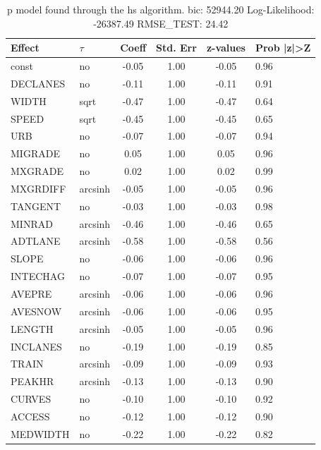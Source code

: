 \begin{table}
	\caption{p model found through the hs algorithm. bic: 52944.20 Log-Likelihood: -26387.49 RMSE_TEST: 24.42}
	\begin{center}
		\begin{tabular}{|l|l|c|c|c|l|}
			\hline
			Effect & $\tau$ & Coeff & Std. Err & z-values & Prob |z|>Z \\
			\hline
			const & no & -0.05 & 1.00 & -0.05 & 0.96 \\
			\hline
			DECLANES & no & -0.11 & 1.00 & -0.11 & 0.91 \\
			\hline
			WIDTH & sqrt & -0.47 & 1.00 & -0.47 & 0.64 \\
			\hline
			SPEED & sqrt & -0.45 & 1.00 & -0.45 & 0.65 \\
			\hline
			URB & no & -0.07 & 1.00 & -0.07 & 0.94 \\
			\hline
			MIGRADE & no & 0.05 & 1.00 & 0.05 & 0.96 \\
			\hline
			MXGRADE & no & 0.02 & 1.00 & 0.02 & 0.99 \\
			\hline
			MXGRDIFF & arcsinh & -0.05 & 1.00 & -0.05 & 0.96 \\
			\hline
			TANGENT & no & -0.03 & 1.00 & -0.03 & 0.98 \\
			\hline
			MINRAD & arcsinh & -0.46 & 1.00 & -0.46 & 0.65 \\
			\hline
			ADTLANE & arcsinh & -0.58 & 1.00 & -0.58 & 0.56 \\
			\hline
			SLOPE & no & -0.06 & 1.00 & -0.06 & 0.96 \\
			\hline
			INTECHAG & no & -0.07 & 1.00 & -0.07 & 0.95 \\
			\hline
			AVEPRE & arcsinh & -0.06 & 1.00 & -0.06 & 0.96 \\
			\hline
			AVESNOW & arcsinh & -0.06 & 1.00 & -0.06 & 0.95 \\
			\hline
			LENGTH & arcsinh & -0.05 & 1.00 & -0.05 & 0.96 \\
			\hline
			INCLANES & no & -0.19 & 1.00 & -0.19 & 0.85 \\
			\hline
			TRAIN & arcsinh & -0.09 & 1.00 & -0.09 & 0.93 \\
			\hline
			PEAKHR & arcsinh & -0.13 & 1.00 & -0.13 & 0.90 \\
			\hline
			CURVES & no & -0.10 & 1.00 & -0.10 & 0.92 \\
			\hline
			ACCESS & no & -0.12 & 1.00 & -0.12 & 0.90 \\
			\hline
			MEDWIDTH & no & -0.22 & 1.00 & -0.22 & 0.82 \\

\end{tabular}
\end{center}
\end{table}
